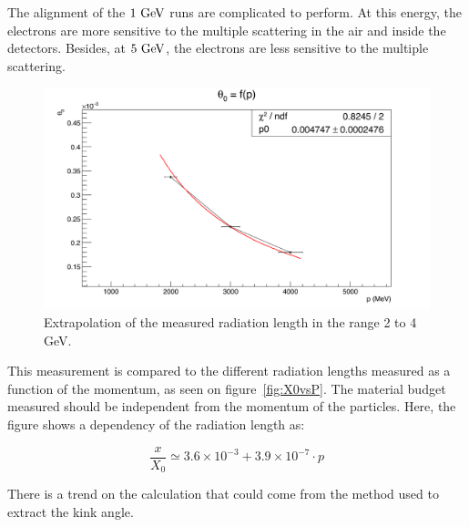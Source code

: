    The alignment of the $1~\rm{GeV}$ runs are complicated to perform.
   At this energy, the electrons are more sensitive to the multiple scattering in the air and inside the detectors.
   Besides, at $5~\rm{GeV}$, the electrons are less sensitive to the multiple scattering.
   
   \begin{figure}[!h]
     \centering
     \includegraphics[width = \textwidth]{Pictures/X0/theta0VsP_2-4GeV.png}
     \caption{Extrapolation of the measured radiation length in the range 2 to 4 GeV.}
     \label{fig:theta0vsP_3-5}
   \end{figure}

   This measurement is compared to the different radiation lengths measured as a function of the momentum, as seen on figure~\ref{fig:X0vsP}.
   The material budget measured should be independent from the momentum of the particles.
   Here, the figure shows a dependency of the radiation length as: 

   \begin{equation}
     \frac{x}{X_0} \simeq 3.6 \times 10^{-3} + 3.9 \times 10^{-7}\cdot p
   \end{equation}

   There is a trend on the calculation that could come from the method used to extract the kink angle.

